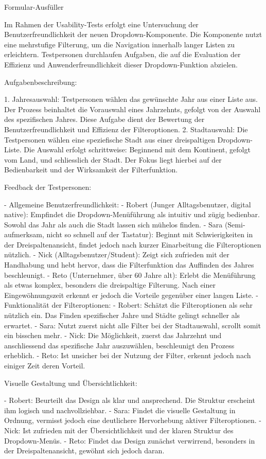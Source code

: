 Formular-Ausfüller

Im Rahmen der Usability-Tests erfolgt eine Untersuchung der Benutzerfreundlichkeit der neuen Dropdown-Komponente.  Die Komponente nutzt eine mehrstufige Filterung, um die Navigation innerhalb langer Listen zu erleichtern. Testpersonen durchlaufen Aufgaben, die auf die Evaluation der Effizienz und Anwenderfreundlichkeit dieser Dropdown-Funktion abzielen.

Aufgabenbeschreibung:

1. Jahresauswahl:
Testpersonen wählen das gewünschte Jahr aus einer Liste aus. Der Prozess beinhaltet die Vorauswahl eines Jahrzehnts, gefolgt von der Auswahl des spezifischen Jahres. Diese Aufgabe dient der Bewertung der Benutzerfreundlichkeit und Effizienz der Filteroptionen.
2. Stadtauswahl:
Die Testpersonen wählen eine speziefische Stadt aus einer dreispaltigen Dropdown-Liste. Die Auswahl erfolgt schrittweise: Beginnend mit dem Kontinent, gefolgt vom Land, und schliesslich der Stadt. Der Fokus liegt hierbei auf der Bedienbarkeit und der Wirksamkeit der Filterfunktion.

Feedback der Testpersonen:

- Allgemeine Benutzerfreundlichkeit:
- Robert (Junger Alltagsbenutzer, digital native): Empfindet die Dropdown-Menüführung als intuitiv und zügig bedienbar. Sowohl das Jahr als auch die Stadt lassen sich mühelos finden.
- Sara (Semi-aufmerksam, nicht so schnell auf der Tastatur): Beginnt mit Schwierigkeiten in der Dreispaltenansicht, findet jedoch nach kurzer Einarbeitung die Filteroptionen nützlich.
- Nick (Alltagsbenutzer/Student): Zeigt sich zufrieden mit der Handhabung und hebt hervor, dass die Filterfunktion das Auffinden des Jahres beschleunigt.
- Reto (Unternehmer, über 60 Jahre alt): Erlebt die Menüführung als etwas komplex, besonders die dreispaltige Filterung. Nach einer Eingewöhnungszeit erkennt er jedoch die Vorteile gegenüber einer langen Liste.
- Funktionalität der Filteroptionen:
- Robert: Schätzt die Filteroptionen als sehr nützlich ein. Das Finden spezifischer Jahre und Städte gelingt schneller als erwartet.
- Sara: Nutzt zuerst nicht alle Filter bei der Stadtauswahl, scrollt somit ein bisschen mehr.
- Nick: Die Möglichkeit, zuerst das Jahrzehnt und anschliessend das spezifische Jahr auszuwählen, beschleunigt den Prozess erheblich.
- Reto: Ist unsicher bei der Nutzung der Filter, erkennt jedoch nach einiger Zeit deren Vorteil.

Visuelle Gestaltung und Übersichtlichkeit:

- Robert: Beurteilt das Design als klar und ansprechend. Die Struktur erscheint ihm logisch und nachvollziehbar.
- Sara: Findet die visuelle Gestaltung in Ordnung, vermisst jedoch eine deutlichere Hervorhebung aktiver Filteroptionen.
- Nick: Ist zufrieden mit der Übersichtlichkeit und der klaren Struktur des Dropdown-Menüs.
- Reto: Findet das Design zunächst verwirrend, besonders in der Dreispaltenansicht, gewöhnt sich jedoch daran.

